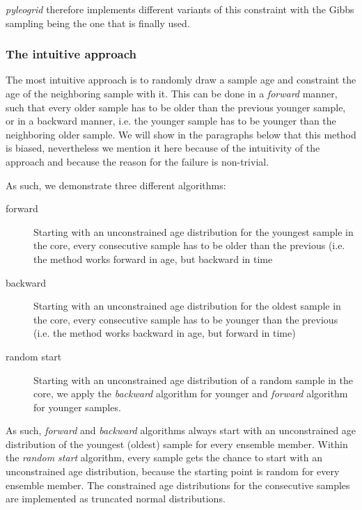 \begin{refsection}
\textit{pyleogrid} therefore implements different variants of this constraint with the Gibbs sampling being the one that is finally used.

\subsubsection{The intuitive approach}
The most intuitive approach is to randomly draw a sample age and constraint the age of the neighboring sample with it. This can be done in a \textit{forward} manner, such that every older sample has to be older than the previous younger sample, or in a backward manner, i.e. the younger sample has to be younger than the neighboring older sample. We will show in the paragraphs below that this method is biased, nevertheless we mention it here because of the intuitivity of the approach and because the reason for the failure is non-trivial.

As such, we demonstrate three different algorithms:

\begin{description}
	\item[forward] Starting with an unconstrained age distribution for the youngest sample in the core, every consecutive sample has to be older than the previous (i.e. the method works forward in age, but backward in time
	\item[backward] Starting with an unconstrained age distribution for the oldest sample in the core, every consecutive sample has to be younger than the previous (i.e. the method works backward in age, but forward in time)
	\item[random start] Starting with an unconstrained age distribution of a random sample in the core, we apply the \textit{backward} algorithm for younger and \textit{forward} algorithm for younger samples.
\end{description}

As such, \textit{forward} and \textit{backward} algorithms always start with an unconstrained age distribution of the youngest (oldest) sample for every ensemble member. Within the \textit{random start} algorithm, every sample gets the chance to start with an unconstrained age distribution, because the starting point is random for every ensemble member. The constrained age distributions for the consecutive samples are implemented as truncated normal distributions.


\end{refsection}
